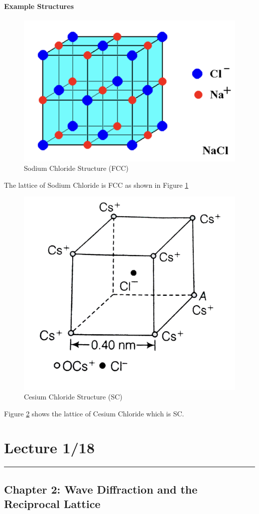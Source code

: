 \documentclass[../main.tex]{subfiles}
\begin{document}
\paragraph{Example Structures}
\begin{figure}[ht]
    \centering
    \includegraphics[scale=0.3]{nacl.png}
    \caption{Sodium Chloride Structure (FCC)}
    \label{fig:1.1}
\end{figure}

The lattice of Sodium Chloride is FCC as shown in Figure \ref{fig:1.1}

\begin{figure}[ht]
    \centering
    \includegraphics[width=0.3\linewidth]{cecl.png}
    \caption{Cesium Chloride Structure (SC)}
    \label{fig:1.2}
\end{figure}

Figure \ref{fig:1.2} shows the lattice of Cesium Chloride which is SC.

\newpage
\section{Lecture 1/18}
\hrule \vspace{10px}

\subsection*{Chapter 2: Wave Diffraction and the Reciprocal Lattice}
\end{document}
